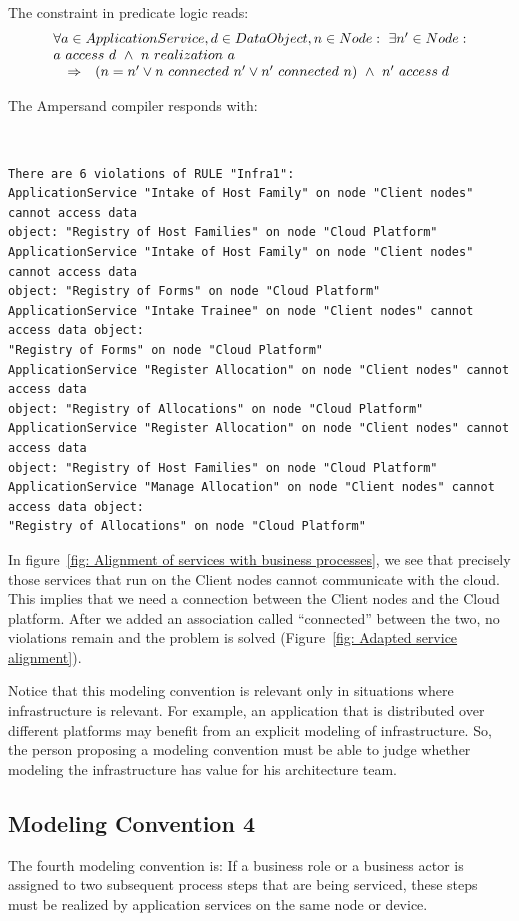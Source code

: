 \documentclass[sn-vancouver]{sn-jnl}%
\begin{document}
The constraint in predicate logic reads:
\[\begin{array}{rcl}
   \multicolumn{3}{l}{\forall a\in Application Service, d\in DataObject, n\in Node:\ \exists n' \in Node: }\\
   \multicolumn{3}{l}{a\ access\ d\ \wedge\ n\ realization\ a}\\
   &\Rightarrow&(n=n'\vee n\ connected\ n'\vee n'\ connected\ n)\ \wedge\ n'\ access \;d
\end{array}\]

The Ampersand compiler responds with:

{\tt\small
\begin{lstlisting}[frame=single, label={mc3result}, caption={}]
There are 6 violations of RULE "Infra1":
ApplicationService "Intake of Host Family" on node "Client nodes" cannot access data 
object: "Registry of Host Families" on node "Cloud Platform"
ApplicationService "Intake of Host Family" on node "Client nodes" cannot access data
object: "Registry of Forms" on node "Cloud Platform"
ApplicationService "Intake Trainee" on node "Client nodes" cannot access data object:
"Registry of Forms" on node "Cloud Platform"
ApplicationService "Register Allocation" on node "Client nodes" cannot access data
object: "Registry of Allocations" on node "Cloud Platform"
ApplicationService "Register Allocation" on node "Client nodes" cannot access data
object: "Registry of Host Families" on node "Cloud Platform"
ApplicationService "Manage Allocation" on node "Client nodes" cannot access data object:
"Registry of Allocations" on node "Cloud Platform"
\end{lstlisting}
}

In figure~\ref{fig: Alignment of services with business processes},
we see that precisely those services that run on the Client nodes cannot communicate with the cloud.
This implies that we need a connection between the Client nodes and the Cloud platform.
After we added an association called ``connected'' between the two, no violations remain and the problem is solved (Figure~\ref{fig: Adapted service alignment}).

Notice that this modeling convention is relevant only in situations where infrastructure is relevant.
For example, an application that is distributed over different platforms may benefit from an explicit modeling of infrastructure.
So, the person proposing a modeling convention must be able to judge whether modeling the infrastructure has value for his architecture team.

\subsection{Modeling Convention 4}\label{Modeling Convention 4}
The fourth modeling convention is:
If a business role or a business actor is assigned to two subsequent process steps that are being serviced,
these steps must be realized by application services on the same node or device.
\end{document}
